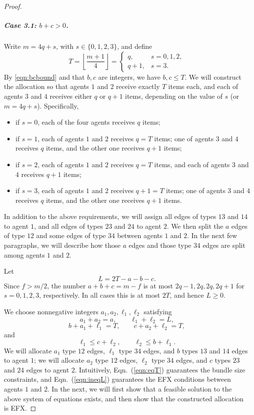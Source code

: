 \documentclass{article}
\theoremstyle{definition}
\begin{document}
\begin{proof}
\subparagraph{Case 3.1: $b+c>0$.}
Write $m=4q+s$, with $s\in\{0,1,2,3\}$, and define
\[
 T=\left\lfloor\frac{m+1}{4}\right\rfloor
 =
 \begin{cases}
 q, & s=0,1,2,\\
 q+1, & s=3.
 \end{cases}
\]
By \eqref{eqn:bcbound} and that $b,c$ are integers, we have $b,c\le T$.  We will construct the allocation so that agents $1$ and $2$
receive exactly $T$ items each, and each of agents $3$ and $4$ receives either $q$ or $q+1$ items, depending on the value of $s$ (or $m=4q+s$).
Specifically,
\begin{itemize}
    \item if $s=0$, each of the four agents receives $q$ items;
    \item if $s=1$, each of agents $1$ and $2$ receives $q=T$ items; one of agents $3$ and $4$ receives $q$ items, and the other one receives $q+1$ items;
    \item if $s=2$, each of agents $1$ and $2$ receives $q=T$ items, and each of agents $3$ and $4$ receives $q+1$ items;
    \item if $s=3$, each of agents $1$ and $2$ receives $q+1=T$ items; one of agents $3$ and $4$ receives $q$ items, and the other one receives $q+1$ items.
\end{itemize}
In addition to the above requirements, we will assign all edges of types $13$ and $14$ to agent $1$, and all edges of types $23$ and $24$ to agent $2$.  
We then split the $a$ edges of type $12$ and some edges of type $34$ between agents $1$ and $2$.
In the next few paragraphs, we will describe how those $a$ edges and those type $34$ edges are split among agents $1$ and $2$.

Let
\[
 L=2T-a-b-c.
\]
Since $f>m/2$, the number $a+b+c=m-f$ is at most
$2q-1,2q,2q,2q+1$ for $s=0,1,2,3$, respectively.  In all cases this is at
most $2T$, and hence $L\ge 0$.

We choose nonnegative integers $a_1,a_2,\ell_1,\ell_2$ satisfying
\[
 a_1+a_2=a,
 \qquad
 \ell_1+\ell_2=L,
\]
\begin{equation}\label{eqn:eqT}
    b+a_1+\ell_1=T,
 \qquad
 c+a_2+\ell_2=T,
\end{equation}
and
\begin{equation}\label{eqn:ineqL}
    \ell_1\le c+\ell_2,
 \qquad
 \ell_2\le b+\ell_1.
\end{equation}
We will allocate $a_1$ type $12$ edges, $\ell_1$ type $34$ edges, and $b$ types $13$ and $14$ edges to agent $1$; we will allocate $a_2$ type $12$ edges, $\ell_2$ type $34$ edges, and $c$ types $23$ and $24$ edges to agent $2$.
Intuitively, Eqn.~(\ref{eqn:eqT}) guarantees the bundle size constraints, and Eqn.~(\ref{eqn:ineqL}) guarantees the EFX conditions between agents $1$ and $2$.
In the next, we will first show that a feasible solution to the above system of equations exists, and then show that the constructed allocation is EFX.



\end{proof}
\end{document}
